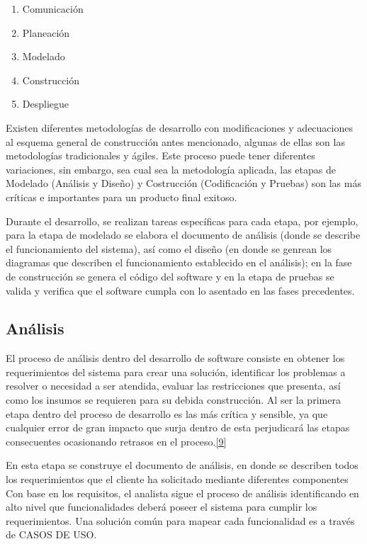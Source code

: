 \begin{enumerate}
	\item Comunicación
	\item Planeación
	\item Modelado
	\item Construcción
	\item Despliegue
\end{enumerate}

Existen diferentes metodologías de desarrollo con modificaciones y adecuaciones al esquema general de construcción antes mencionado, algunas de ellas son las metodologías tradicionales y ágiles. Este proceso puede tener diferentes variaciones, sin embargo, sea cual sea la metodología aplicada, las etapas de Modelado (Análisis y Diseño) y Costrucción (Codificación y Pruebas) son las más críticas e importantes para un producto final exitoso.

Durante el desarrollo, se realizan tareas específicas para cada etapa, por ejemplo, para la etapa de modelado se elabora el documento de análisis (donde se describe el funcionamiento del sistema), así como el diseño (en donde se genrean los diagramas que describen el funcionamiento establecido en el análisis); en la fase de construcción se genera el código del software y en la etapa de pruebas se valida y verifica que el software cumpla con lo asentado en las fases precedentes.

\subsection{Análisis}

El proceso de análisis dentro del desarrollo de software consiste en obtener los requerimientos del sistema para crear una solución, identificar los problemas a resolver o necesidad a ser atendida, evaluar las restricciones que presenta, así como los insumos se requieren para su debida construcción.
Al ser la primera etapa dentro del proceso de desarrollo es las más crítica y sensible, ya que cualquier error de gran impacto que surja dentro de esta perjudicará las etapas consecuentes ocasionando retrasos en el proceso.\hyperlink{b09}{[9]} 

\bigskip

En esta etapa se construye el documento de análisis, en donde se describen todos los requerimientos que el cliente ha solicitado mediante diferentes componentes
Con base en los requisitos, el analista sigue el proceso de análisis identificando en alto nivel que funcionalidades deberá poseer el sistema para cumplir los requerimientos. Una solución común para mapear cada funcionalidad es a través de CASOS DE USO.

